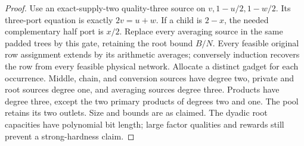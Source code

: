 \begin{proof}
Use an exact-supply-two quality-three source on
$v,1-u/2,1-w/2$. Its three-port equation is exactly $2v=u+w$.
If a child is $2-x$, the needed complementary half port is $x/2$.
Replace every averaging source in the same padded trees by this gate,
retaining the root bound $B/N$. Every feasible original row assignment
extends by its arithmetic averages; conversely induction recovers the
row from every feasible physical network. Allocate a distinct gadget
for each occurrence. Middle, chain, and conversion sources have degree
two, private and root sources degree one, and averaging sources degree
three. Products have degree three, except the two primary products of
degrees two and one. The pool retains its two outlets. Size and bounds
are as claimed. The dyadic root capacities have polynomial bit length;
large factor qualities and rewards still prevent a strong-hardness claim.
\end{proof}

